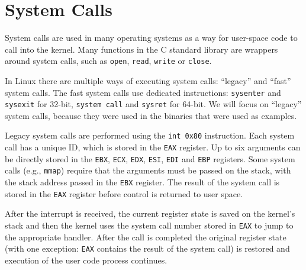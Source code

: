 \documentclass[draft,final]{vutinfth} %
\begin{document}
\section{System Calls}
\label{system calls}

System calls are used in many operating systems as a way for user-space code to call into the kernel. Many functions in the C standard library are wrappers around system calls, such as \texttt{open}, \texttt{read}, \texttt{write} or \texttt{close}.

In Linux there are multiple ways of executing system calls\cite[Chapter 10]{UnderstandingKernel}: ``legacy'' and ``fast'' system calls. The fast system calls use dedicated instructions: \texttt{sysenter} and \texttt{sysexit} for 32-bit, \texttt{system call} and \texttt{sysret} for 64-bit. We will focus on ``legacy'' system calls, because they were used in the binaries that were used as examples.

Legacy system calls are performed using the \texttt{int 0x80} instruction. Each system call has a unique ID, which is stored in the \texttt{EAX} register. Up to six arguments can be directly stored in the \texttt{EBX}, \texttt{ECX}, \texttt{EDX}, \texttt{ESI}, \texttt{EDI} and \texttt{EBP} registers. Some system calls (e.g., \texttt{mmap}) require that the arguments must be passed on the stack, with the stack address passed in the \texttt{EBX} register. The result of the system call is stored in the \texttt{EAX} register before control is returned to user space.

After the interrupt is received, the current register state is saved on the kernel's stack and then the kernel uses the system call number stored in \texttt{EAX} to jump to the appropriate handler. After the call is completed the original register state (with one exception: \texttt{EAX} contains the result of the system call) is restored and execution of the user code process continues.
\end{document}
